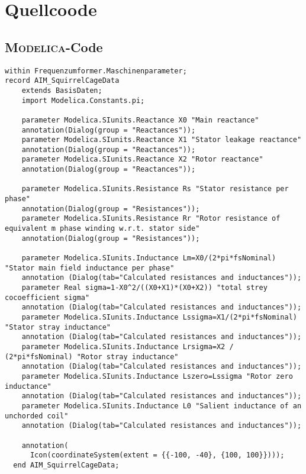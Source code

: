 \chapter{Quellcoode}
\label{chap:Quellcode}

\section{\textsc{Modelica}-Code}
\label{sec:ModelicaCode}

\begin{lstlisting}[language=modelica,caption=Record für die Maschinendaten der Asynchronmaschine,label=lst:RecordASMData]
within Frequenzumformer.Maschinenparameter;
record AIM_SquirrelCageData
    extends BasisDaten;
    import Modelica.Constants.pi;
    
    parameter Modelica.SIunits.Reactance X0 "Main reactance"
    annotation(Dialog(group = "Reactances"));
    parameter Modelica.SIunits.Reactance X1 "Stator leakage reactance"
    annotation(Dialog(group = "Reactances"));
    parameter Modelica.SIunits.Reactance X2 "Rotor reactance"
    annotation(Dialog(group = "Reactances"));
    
    parameter Modelica.SIunits.Resistance Rs "Stator resistance per phase"
    annotation(Dialog(group = "Resistances"));
    parameter Modelica.SIunits.Resistance Rr "Rotor resistance of equivalent m phase winding w.r.t. stator side"
    annotation(Dialog(group = "Resistances"));
    
    parameter Modelica.SIunits.Inductance Lm=X0/(2*pi*fsNominal) "Stator main field inductance per phase"
    annotation (Dialog(tab="Calculated resistances and inductances"));
    parameter Real sigma=1-X0^2/((X0+X1)*(X0+X2)) "total strey cocoefficient sigma"
    annotation (Dialog(tab="Calculated resistances and inductances"));
    parameter Modelica.SIunits.Inductance Lssigma=X1/(2*pi*fsNominal) "Stator stray inductance"
    annotation (Dialog(tab="Calculated resistances and inductances"));
    parameter Modelica.SIunits.Inductance Lrsigma=X2 / (2*pi*fsNominal) "Rotor stray inductance"
    annotation (Dialog(tab="Calculated resistances and inductances"));
    parameter Modelica.SIunits.Inductance Lszero=Lssigma "Rotor zero inductance" 
    annotation (Dialog(tab="Calculated resistances and inductances"));
    parameter Modelica.SIunits.Inductance L0 "Salient inductance of an unchorded coil"
    annotation (Dialog(tab="Calculated resistances and inductances"));

    annotation(
      Icon(coordinateSystem(extent = {{-100, -40}, {100, 100}})));
  end AIM_SquirrelCageData;
\end{lstlisting}



